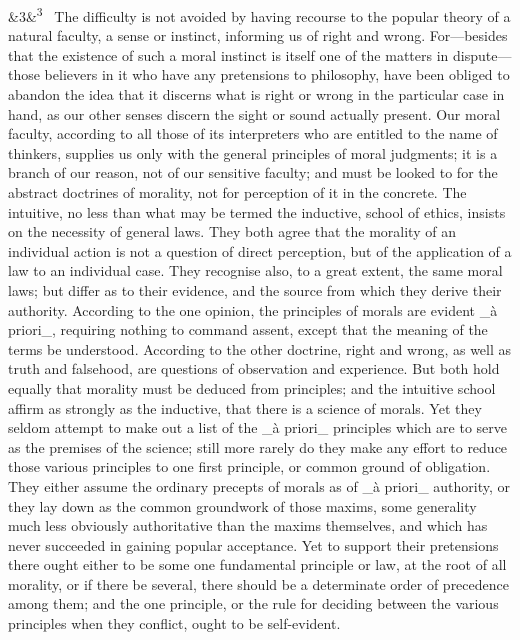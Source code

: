 \documentclass[12pt]{article}
\newcommand{\para}[1][]{\par\noindent\ifx&#1&\else\textsuperscript{\footnotesize #1}~\fi}
\begin{document}
\para[3] The difficulty is not avoided by having recourse to the popular theory of a natural faculty, a sense or instinct, informing us of right and wrong. For---besides that the existence of such a moral instinct is itself one of the matters in dispute---those believers in it who have any pretensions to philosophy, have been obliged to abandon the idea that it discerns what is right or wrong in the particular case in hand, as our other senses discern the sight or sound actually present. Our moral faculty, according to all those of its interpreters who are entitled to the name of thinkers, supplies us only with the general principles of moral judgments; it is a branch of our reason, not of our sensitive faculty; and must be looked to for the abstract doctrines of morality, not for perception of it in the concrete. The intuitive, no less than what may be termed the inductive, school of ethics, insists on the necessity of general laws. They both agree that the morality of an individual action is not a question of direct perception, but of the application of a law to an individual case. They recognise also, to a great extent, the same moral laws; but differ as to their evidence, and the source from which they derive their authority. According to the one opinion, the principles of morals are evident \_à priori\_, requiring nothing to command assent, except that the meaning of the terms be understood. According to the other doctrine, right and wrong, as well as truth and falsehood, are questions of observation and experience. But both hold equally that morality must be deduced from principles; and the intuitive school affirm as strongly as the inductive, that there is a science of morals. Yet they seldom attempt to make out a list of the \_à priori\_ principles which are to serve as the premises of the science; still more rarely do they make any effort to reduce those various principles to one first principle, or common ground of obligation. They either assume the ordinary precepts of morals as of \_à priori\_ authority, or they lay down as the common groundwork of those maxims, some generality much less obviously authoritative than the maxims themselves, and which has never succeeded in gaining popular acceptance. Yet to support their pretensions there ought either to be some one fundamental principle or law, at the root of all morality, or if there be several, there should be a determinate order of precedence among them; and the one principle, or the rule for deciding between the various principles when they conflict, ought to be self-evident.
\end{document}
